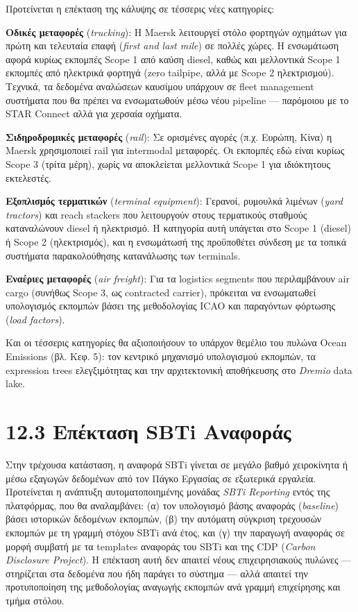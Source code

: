 Προτείνεται η επέκταση της κάλυψης σε τέσσερις νέες κατηγορίες:

\textbf{Οδικές μεταφορές} (\emph{trucking}): Η Maersk λειτουργεί στόλο
φορτηγών οχημάτων για πρώτη και τελευταία επαφή (\emph{first and last
mile}) σε πολλές χώρες. Η ενσωμάτωση αφορά κυρίως εκπομπές Scope 1 από
καύση diesel, καθώς και μελλοντικά Scope 1 εκπομπές από ηλεκτρικά
φορτηγά (zero tailpipe, αλλά με Scope 2 ηλεκτρισμού). Τεχνικά, τα
δεδομένα αναλώσεων καυσίμου υπάρχουν σε fleet management συστήματα που
θα πρέπει να ενσωματωθούν μέσω νέου pipeline --- παρόμοιου με το STAR
Connect αλλά για χερσαία οχήματα.

\textbf{Σιδηροδρομικές μεταφορές} (\emph{rail}): Σε ορισμένες αγορές
(π.χ. Ευρώπη, Κίνα) η Maersk χρησιμοποιεί rail για intermodal μεταφορές.
Οι εκπομπές εδώ είναι κυρίως Scope 3 (τρίτα μέρη), χωρίς να αποκλείεται
μελλοντικά Scope 1 για ιδιόκτητους εκτελεστές.

\textbf{Εξοπλισμός τερματικών} (\emph{terminal equipment}): Γερανοί,
ρυμουλκά λιμένων (\emph{yard tractors}) και reach stackers που
λειτουργούν στους τερματικούς σταθμούς καταναλώνουν diesel ή ηλεκτρισμό.
Η κατηγορία αυτή υπάγεται στο Scope 1 (diesel) ή Scope 2 (ηλεκτρισμός),
και η ενσωμάτωσή της προϋποθέτει σύνδεση με τα τοπικά συστήματα
παρακολούθησης κατανάλωσης των terminals.

\textbf{Εναέριες μεταφορές} (\emph{air freight}): Για τα logistics
segments που περιλαμβάνουν air cargo (συνήθως Scope 3, ως contracted
carrier), πρόκειται να ενσωματωθεί υπολογισμός εκπομπών βάσει της
μεθοδολογίας ICAO και παραγόντων φόρτωσης (\emph{load factors}).

Και οι τέσσερις κατηγορίες θα αξιοποιήσουν το υπάρχον θεμέλιο του πυλώνα
Ocean Emissions (βλ. Κεφ. 5): τον κεντρικό μηχανισμό υπολογισμού
εκπομπών, τα expression trees ελεγξιμότητας και την αρχιτεκτονική
αποθήκευσης στο \emph{Dremio} data lake.

\section{12.3 Επέκταση SBTi
Αναφοράς}\label{ux3b5ux3c0ux3adux3baux3c4ux3b1ux3c3ux3b7-sbti-ux3b1ux3bdux3b1ux3c6ux3bfux3c1ux3acux3c2}

Στην τρέχουσα κατάσταση, η αναφορά SBTi γίνεται σε μεγάλο βαθμό
χειροκίνητα ή μέσω εξαγωγών δεδομένων από τον Πάγκο Εργασίας σε
εξωτερικά εργαλεία. Προτείνεται η ανάπτυξη αυτοματοποιημένης μονάδας
\emph{SBTi Reporting} εντός της πλατφόρμας, που θα αναλαμβάνει: (α) τον
υπολογισμό βάσης αναφοράς (\emph{baseline}) βάσει ιστορικών δεδομένων
εκπομπών, (β) την αυτόματη σύγκριση τρεχουσών εκπομπών με τη γραμμή
στόχου SBTi ανά έτος, και (γ) την παραγωγή αναφοράς σε μορφή συμβατή με
τα templates αναφοράς του SBTi και της CDP (\emph{Carbon Disclosure
Project}). Η επέκταση αυτή δεν απαιτεί νέους επιχειρησιακούς πυλώνες ---
στηρίζεται στα δεδομένα που ήδη παράγει το σύστημα --- αλλά απαιτεί την
προτυποποίηση της μεθοδολογίας αναγωγής εκπομπών ανά γραμμή επιχείρησης
και τμήμα στόλου.

